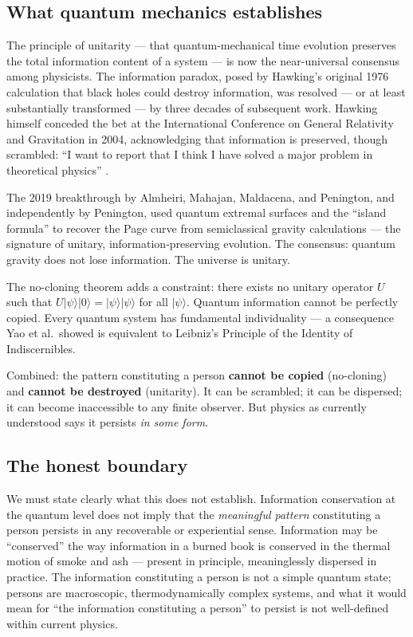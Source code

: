 \documentclass[12pt, a4paper]{article}
\begin{document}
\subsection{What quantum mechanics establishes}

The principle of unitarity --- that quantum-mechanical time evolution preserves the total
information content of a system --- is now the near-universal consensus among physicists.
The information paradox, posed by Hawking's original 1976 calculation that black holes could
destroy information, was resolved --- or at least substantially transformed --- by three
decades of subsequent work. Hawking himself conceded the bet at the International Conference
on General Relativity and Gravitation in 2004, acknowledging that information is preserved,
though scrambled: ``I want to report that I think I have solved a major problem in theoretical
physics'' \citep{hawking2005}.

The 2019 breakthrough by Almheiri, Mahajan, Maldacena, and Penington, and independently by
Penington, used quantum extremal surfaces and the ``island formula'' to recover the Page
curve from semiclassical gravity calculations --- the signature of unitary,
information-preserving evolution. The consensus: quantum gravity does not lose information.
The universe is unitary.

The no-cloning theorem \citep{wootters1982} adds a constraint: there exists no unitary
operator $U$ such that $U|\psi\rangle|0\rangle = |\psi\rangle|\psi\rangle$ for all
$|\psi\rangle$. Quantum information cannot be perfectly copied. Every quantum system has
fundamental individuality --- a consequence Yao et al.\ showed is equivalent to Leibniz's
Principle of the Identity of Indiscernibles.

Combined: the pattern constituting a person \textbf{cannot be copied} (no-cloning) and
\textbf{cannot be destroyed} (unitarity). It can be scrambled; it can be dispersed; it can
become inaccessible to any finite observer. But physics as currently understood says it
persists \textit{in some form}.

\subsection{The honest boundary}

We must state clearly what this does not establish. Information conservation at the quantum
level does not imply that the \textit{meaningful pattern} constituting a person persists in
any recoverable or experiential sense. Information may be ``conserved'' the way information
in a burned book is conserved in the thermal motion of smoke and ash --- present in
principle, meaninglessly dispersed in practice. The information constituting a person is not
a simple quantum state; persons are macroscopic, thermodynamically complex systems, and what
it would mean for ``the information constituting a person'' to persist is not well-defined
within current physics.
\end{document}
